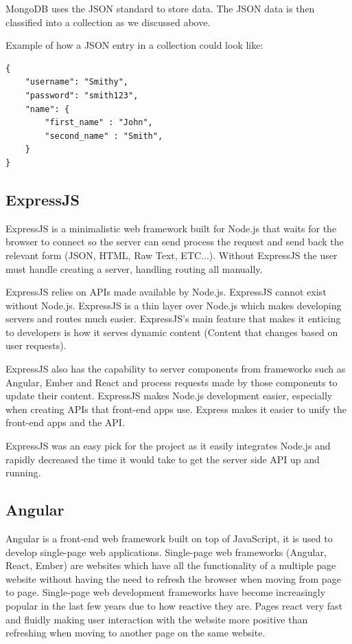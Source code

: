 MongoDB uses the JSON standard to store data. The JSON data is then classified into a collection as we discussed above. 

Example of how a JSON entry in a collection could look like:

\begin{verbatim}
{
    "username": "Smithy",
    "password": "smith123",
    "name": {
        "first_name" : "John",
        "second_name" : "Smith",
    }
}
\end{verbatim}

\subsection{ExpressJS}
ExpressJS is a minimalistic web framework built for Node.js that waits for the browser to connect so the server can send process the request and send back the relevant form (JSON, HTML, Raw Text, ETC...). Without ExpressJS the user must handle creating a server, handling routing all manually.

ExpressJS relies on APIs made available by Node.js. ExpressJS cannot exist without Node.js. ExpressJS is a thin layer over Node.js which makes developing servers and routes much easier. ExpressJS's main feature that makes it enticing to developers is how it serves dynamic content (Content that changes based on user requests). 

ExpressJS also has the capability to server components from frameworks such as Angular, Ember and React and process requests made by those components to update their content. ExpressJS makes Node.js development easier, especially when creating APIs that front-end apps use. Express makes it easier to unify the front-end apps and the API.

ExpressJS was an easy pick for the project as it easily integrates Node.js and rapidly decreased the time it would take to get the server side API up and running.

\subsection{Angular}
Angular is a front-end web framework built on top of JavaScript, it is used to develop single-page web applications. Single-page web frameworks (Angular, React, Ember) are websites which have all the functionality of a multiple page website without having the need to refresh the browser when moving from page to page. Single-page web development frameworks have become increasingly popular in the last few years due to how reactive they are. Pages react very fast and fluidly making user interaction with the website more positive than refreshing when moving to another page on the same website. 

